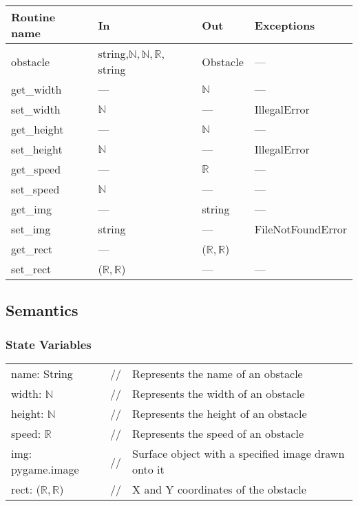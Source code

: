 \documentclass[12pt]{article}
\begin{document}
\begin{tabular}{| l | l | l | l |}
\hline
\textbf{Routine name} & \textbf{In} & \textbf{Out} & \textbf{Exceptions}\\
\hline
    obstacle & string,$\mathbb{N, N, R}$, string & Obstacle & ---\\
\hline
    get\_width & --- & $\mathbb{N}$ & ---\\
\hline
    set\_width & $\mathbb{N}$ & --- & IllegalError\\
\hline
    get\_height & --- & $\mathbb{N}$ & ---\\
\hline
    set\_height & $\mathbb{N}$ & --- & IllegalError\\
\hline
    get\_speed & --- & $\mathbb{R}$ & --- \\
\hline
    set\_speed & $\mathbb{N}$ & ---& --- \\
\hline
    get\_img & --- & string & ---\\
\hline
    set\_img & string & --- & FileNotFoundError\\

\hline
    get\_rect & --- & ($\mathbb{R,R}$) & \\
\hline
    set\_rect & ($\mathbb{R,R}$) & --- & ---\\
\hline
\end{tabular}

\subsection* {Semantics}

\subsubsection* {State Variables}
\begin{tabular}{lll}
name: String & // & Represents the name of an obstacle\\
    width: $\mathbb{N}$ & // & Represents the width of an obstacle\\
    height: $\mathbb{N}$ & // & Represents the height of an obstacle\\
    speed: $\mathbb{R}$ & // & Represents the speed of an obstacle\\
    img: pygame.image & // & Surface object with a specified image drawn onto it\\
    rect: ($\mathbb{R,R}$) & // & X and Y coordinates of the obstacle\\
\end{tabular}
\end{document}
